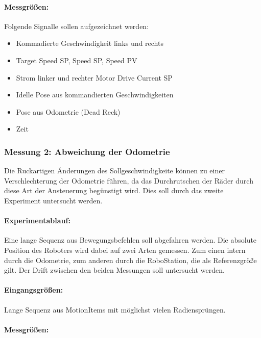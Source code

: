 \paragraph{Messgrößen:}
\label{messgroen}

Folgende Signalle sollen aufgezeichnet werden:

\begin{itemize}
\item  Kommadierte Geschwindigkeit links und rechts
\item  Target Speed SP, Speed SP, Speed PV
\item  Strom linker und rechter Motor Drive Current SP
\item  Idelle Pose aus kommandierten Geschwindigkeiten
\item  Pose aus Odometrie (Dead Reck)
\item  Zeit
\end{itemize}

\subsubsection{Messung 2: Abweichung der Odometrie}
\label{messung-2-abweichung-der-odometrie}

Die Ruckartigen Änderungen des Sollgeschwindigkeite können zu einer Verschlechterung der Odometrie führen, da das Durchrutschen der Räder durch diese Art der Ansteuerung begünstigt wird. Dies soll durch das zweite Experiment untersucht werden.

\paragraph{Experimentablauf:}
\label{experimentablauf-1}

Eine lange Sequenz aus Bewegungsbefehlen soll abgefahren werden. Die absolute Position des Roboters wird dabei auf zwei Arten gemessen. Zum einen intern durch die Odometrie, zum anderen durch die RoboStation, die als Referenzgröße gilt. Der Drift zwischen den beiden Messungen soll untersucht werden.

\paragraph{Eingangsgrößen:}
\label{eingangsgroen-1}

Lange Sequenz aus MotionItems mit möglichst vielen Radiensprüngen.

\paragraph{Messgrößen:}
\label{messgroen-1}


